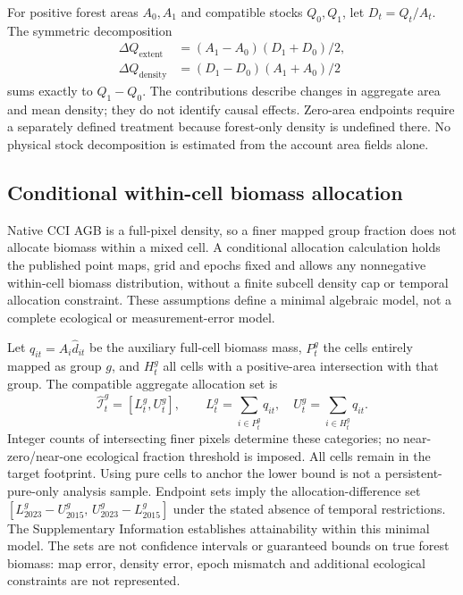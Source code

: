 \documentclass[11pt,a4paper]{article}
\begin{document}
For positive forest areas $A_0,A_1$ and compatible stocks $Q_0,Q_1$, let $D_t=Q_t/A_t$. The symmetric decomposition
\begin{align}
\Delta Q_{\mathrm{extent}}&=(A_1-A_0)(D_1+D_0)/2,\label{eq:extent}\\
\Delta Q_{\mathrm{density}}&=(D_1-D_0)(A_1+A_0)/2\label{eq:density}
\end{align}
sums exactly to $Q_1-Q_0$. The contributions describe changes in aggregate area and mean density; they do not identify causal effects. Zero-area endpoints require a separately defined treatment because forest-only density is undefined there. No physical stock decomposition is estimated from the account area fields alone.

\subsection{Conditional within-cell biomass allocation}
Native CCI AGB is a full-pixel density, so a finer mapped group fraction does not allocate biomass within a mixed cell. A conditional allocation calculation holds the published point maps, grid and epochs fixed and allows any nonnegative within-cell biomass distribution, without a finite subcell density cap or temporal allocation constraint. These assumptions define a minimal algebraic model, not a complete ecological or measurement-error model.

Let $q_{it}=A_i\widehat d_{it}$ be the auxiliary full-cell biomass mass, $P_t^g$ the cells entirely mapped as group $g$, and $H_t^g$ all cells with a positive-area intersection with that group. The compatible aggregate allocation set is
\[
\widehat{\mathcal I}_t^g=[L_t^g,U_t^g],\qquad
L_t^g=\sum_{i\in P_t^g}q_{it},\quad U_t^g=\sum_{i\in H_t^g}q_{it}.
\]
Integer counts of intersecting finer pixels determine these categories; no near-zero/near-one ecological fraction threshold is imposed. All cells remain in the target footprint. Using pure cells to anchor the lower bound is not a persistent-pure-only analysis sample. Endpoint sets imply the allocation-difference set $[L_{2023}^g-U_{2015}^g,\,U_{2023}^g-L_{2015}^g]$ under the stated absence of temporal restrictions. The Supplementary Information establishes attainability within this minimal model. The sets are not confidence intervals or guaranteed bounds on true forest biomass: map error, density error, epoch mismatch and additional ecological constraints are not represented.
\end{document}

